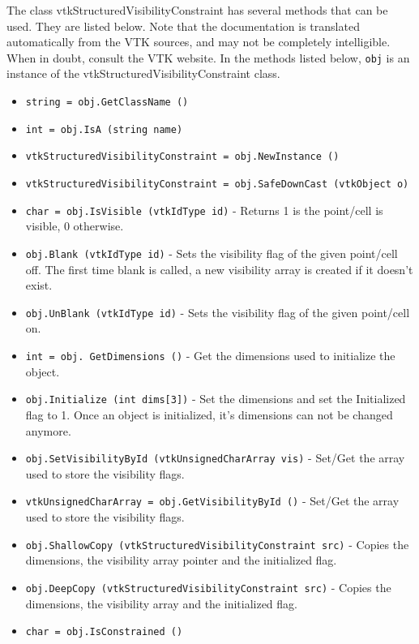 The class vtkStructuredVisibilityConstraint has several methods that can be used.
  They are listed below.
Note that the documentation is translated automatically from the VTK sources,
and may not be completely intelligible.  When in doubt, consult the VTK website.
In the methods listed below, \verb|obj| is an instance of the vtkStructuredVisibilityConstraint class.
\begin{itemize}
\item  \verb|string = obj.GetClassName ()|

\item  \verb|int = obj.IsA (string name)|

\item  \verb|vtkStructuredVisibilityConstraint = obj.NewInstance ()|

\item  \verb|vtkStructuredVisibilityConstraint = obj.SafeDownCast (vtkObject o)|

\item  \verb|char = obj.IsVisible (vtkIdType id)| -  Returns 1 is the point/cell is visible, 0 otherwise.

\item  \verb|obj.Blank (vtkIdType id)| -  Sets the visibility flag of the given point/cell off.
 The first time blank is called, a new visibility array
 is created if it doesn't exist.

\item  \verb|obj.UnBlank (vtkIdType id)| -  Sets the visibility flag of the given point/cell on.

\item  \verb|int = obj. GetDimensions ()| -  Get the dimensions used to initialize the object.

\item  \verb|obj.Initialize (int dims[3])| -  Set the dimensions and set the Initialized flag to 1. Once
 an object is initialized, it's dimensions can not be
 changed anymore.

\item  \verb|obj.SetVisibilityById (vtkUnsignedCharArray vis)| -  Set/Get the array used to store the visibility flags.

\item  \verb|vtkUnsignedCharArray = obj.GetVisibilityById ()| -  Set/Get the array used to store the visibility flags.

\item  \verb|obj.ShallowCopy (vtkStructuredVisibilityConstraint src)| -  Copies the dimensions, the visibility array pointer
 and the initialized flag.

\item  \verb|obj.DeepCopy (vtkStructuredVisibilityConstraint src)| -  Copies the dimensions, the visibility array
 and the initialized flag.

\item  \verb|char = obj.IsConstrained ()|

\end{itemize}
